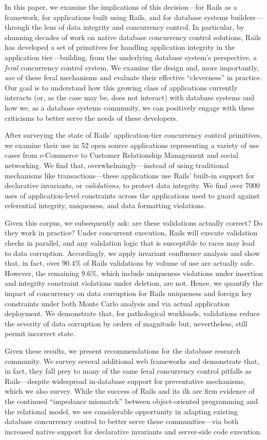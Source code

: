 In this paper, we examine the implications of this decision---for
Rails as a framework, for applications built using Rails, and for
database systems builders---through the lens of data integrity and
concurrency control. In particular, by shunning decades of work on
native database concurrency control solutions, Rails has developed a
set of primitives for handling application integrity in the
application tier---building, from the underlying database system's
perspective, a \textit{feral} concurrency control system. We examine
the design and, more importantly, \textit{use} of these feral
mechanisms and evaluate their effective ``cleverness'' in
practice. Our goal is to understand how this growing class of
applications currently interacts (or, as the case may be, does not
interact) with database systems and how we, as a database systems
community, we can positively engage with these criticisms to better
serve the needs of these developers.

After surveying the state of Rails' application-tier concurrency
control primitives, we examine their use in 52 open source
applications representing a variety of use cases from e-Commerce to
Customer Relationship Management and social networking. We find that,
overwhelmingly---instead of using traditional mechanisms like
transactions---these applications use Rails' built-in support for
declarative invariants, or \textit{validations}, to protect data
integrity. We find over $7000$ uses of application-level constraints
across the applications used to guard against referential integrity,
uniqueness, and data formatting violations.

Given this corpus, we subsequently ask: are these validations actually
correct? Do they work in practice? Under concurrent execution, Rails
will execute validation checks in parallel, and any validation logic
that is susceptible to races may lead to data corruption. Accordingly,
we apply invariant confluence analysis and show that, in fact, over
$90.4\%$ of Rails validations by volume of use are actually
safe. However, the remaining $9.6\%$, which include uniqueness
violations under insertion and integrity constraint violations under
deletion, are not. Hence, we quantify the impact of concurrency on
data corruption for Rails uniqueness and foreign key constraints under
both Monte Carlo analysis and via actual application deployment. We
demonstrate that, for pathological workloads, validations reduce the
severity of data corruption by orders of magnitude but, nevertheless,
still permit incorrect state.

Given these results, we present recommendations for the
database research community. We survey several additional web
frameworks and demonstrate that, in fact, they fall prey to many of
the same feral concurrency control pitfalls as Rails---despite
widespread in-database support for preventative mechanisms, which we
also survey. While the success of Rails and its ilk are firm evidence
of the continued ``impedance mismatch'' between object-oriented
programming and the relational model, we see considerable opportunity
in adapting existing database concurrency control to better serve
these communities---via both increased native support for declarative invariants
and server-side code execution.
